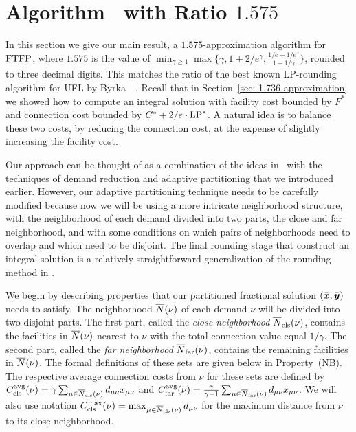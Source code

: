 \documentclass[11pt]{article}
\begin{document}

\section{Algorithm~{\EBGS} with Ratio $1.575$}\label{sec: 1.575-approximation}

In this section we give our main result, a $1.575$-approximation
algorithm for $\mbox{\rm FTFP}$, where $1.575$ is the value of $\min_{\gamma\geq
  1}\max\{\gamma, 1+2/e^\gamma, \frac{1/e+1/e^\gamma}{1-1/\gamma}\}$,
rounded to three decimal digits. This matches the ratio of the best
known LP-rounding algorithm for UFL by
Byrka~{\etal}~\cite{ByrkaGS10}. Recall that in Section~\ref{sec:
  1.736-approximation} we showed how to compute an integral solution
with facility cost bounded by $F^\ast$ and connection cost bounded by
$C^\ast + 2/e\cdot\mbox{\rm LP}^\ast$. A natural idea is to balance these two
costs, by reducing the connection cost, at the expense of slightly
increasing the facility cost.

Our approach can be thought of as a combination of the ideas
in~\cite{ByrkaGS10} with the techniques of demand reduction and
adaptive partitioning that we introduced earlier. However, our
adaptive partitioning technique needs to be carefully modified because
now we will be using a more intricate neighborhood structure, with the
neighborhood of each demand divided into two parts, the close and far
neighborhood, and with some conditions on which pairs of neighborhoods
need to overlap and which need to be disjoint. The final rounding
stage that construct an integral solution is a relatively
straightforward generalization of the rounding method in
\cite{ByrkaGS10}.

We begin by describing properties that our partitioned fractional
solution $(\bar{\boldsymbol{x}},\bar{\boldsymbol{y}})$ needs to satisfy. The neighborhood
${\overline{N}}(\nu)$ of each demand $\nu$ will be divided into two disjoint
parts.  The first part, called the \emph{close neighborhood}
${\overline{N}}_{\text{cls}}(\nu)$, contains the facilities in ${\overline{N}}(\nu)$ nearest to
$\nu$ with the total connection value equal $1/\gamma$. The second
part, called the \emph{far neighborhood} ${\overline{N}}_{\text{far}}(\nu)$, contains
the remaining facilities in ${\overline{N}}(\nu)$. The formal definitions of
these sets are given below in Property~(NB).  The respective average
connection costs from $\nu$ for these sets are defined by
$C_{\text{cls}}^{{\mbox{\scriptsize\rm avg}}}(\nu)=\gamma\sum_{\mu\in{\overline{N}}_{\text{cls}}(\nu)}
d_{\mu\nu}{\bar x}_{\mu\nu}$ and
$C_{\text{far}}^{{\mbox{\scriptsize\rm avg}}}(\nu)=\frac{\gamma}{\gamma-1}\sum_{\mu\in{\overline{N}}_{\text{far}}(\nu)}
d_{\mu\nu}{\bar x}_{\mu\nu}$. We will also use notation
$C_{\text{cls}}^{\max}(\nu)=\max_{\mu\in{\overline{N}}_{\text{cls}}(\nu)} d_{\mu\nu}$ for the maximum
distance from $\nu$ to its close neighborhood.
\end{document}
